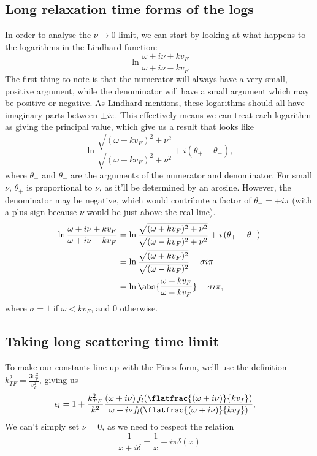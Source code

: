 \documentclass[../../main.tex]{subfiles}
\newcommand{\vf}{v_F}
\begin{document}
\subsection{Long relaxation time forms of the logs}
In order to analyse the $\nu \rightarrow 0$ limit, we can start by looking at what happens to the logarithms in the Lindhard function:
\begin{equation}
	\ln\frac{\omega + i \nu + k\vf}{\omega + i \nu - k\vf}
\end{equation}
The first thing to note is that the numerator will always have a very small, positive argument, while the denominator will have a small argument which may be positive or negative. As Lindhard mentions, these logarithms should all have imaginary parts between $\pm i \pi$. This effectively means we can treat each logarithm as giving the principal value, which give us a result that looks like
\begin{equation}
	\ln\frac{\sqrt{(\omega + k\vf) ^2 + \nu^2}}{\sqrt{(\omega - k\vf) ^2 + \nu^2}} + i \left(\theta_+ - \theta_- \right),
\end{equation}
where $\theta_+$ and $\theta_-$ are the arguments of the numerator and denominator. For small $\nu$, $\theta_+$ is proportional to $\nu$, as it'll be determined by an arcsine. However, the denominator may be negative, which would contribute a factor of $\theta_- = +i\pi$ (with a plus sign because $\nu$ would be just above the real line).
\begin{align}
	\ln\frac{\omega + i \nu + k\vf}{\omega + i \nu - k\vf} &= \ln\frac{\sqrt{(\omega + k\vf) ^2 + \nu^2}}{\sqrt{(\omega - k\vf) ^2 + \nu^2}} + i \left(\theta_+ - \theta_- \right) \\
	&= \ln\frac{\sqrt{(\omega + k\vf) ^2}}{\sqrt{(\omega - k\vf) ^2}} - \sigma i \pi \\
	&= \ln\abs{\frac{\omega + k\vf}{\omega - k\vf}} - \sigma i \pi,
\end{align}
where $\sigma = 1$ if $\omega < k\vf$, and $0$ otherwise.

\subsection{Taking long scattering time limit}

To make our constants line up with the Pines form, we'll use the definition $k_{TF}^2 = \frac{3 \omega_p^2}{\vf^2}$, giving us
\begin{align}
 \epsilon_l &= 1 + \frac{k_{TF}^2}{k^2} \frac{\left(\omega + i \nu \right) f_l(\flatfrac{(\omega + i \nu)}{k v_f})}{\omega + i \nu f_l(\flatfrac{(\omega + i \nu)}{k v_f})},
\end{align}
We can't simply set $\nu = 0$, as we need to respect the relation
\begin{equation}
	\frac{1}{x + i \delta} = \frac{1}{x} - i \pi \delta(x)
\end{equation}
\end{document}

